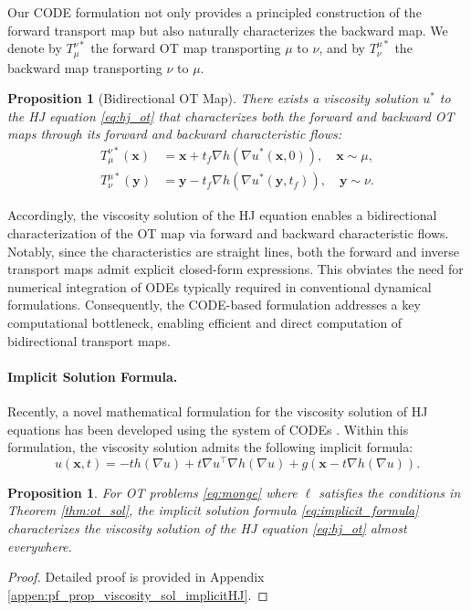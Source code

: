 \documentclass{article} %
\theoremstyle{plain}
\newtheorem{proposition}[theorem]{Proposition}
\theoremstyle{definition}
\theoremstyle{remark}
\newcommand{\bx}{\mathbf{x}}
\newcommand{\by}{\mathbf{y}}
\newcommand{\tp}{^{\top}}
\begin{document}
Our CODE formulation not only provides a principled construction of the forward transport map but also naturally characterizes the backward map. 
We denote by \( T^{\nu*}_\mu \) the forward OT map transporting \( \mu \) to \( \nu \), and by \( T^{\mu*}_\nu \) the backward map transporting \( \nu \) to \( \mu \).
\begin{proposition}[Bidirectional OT Map] 
There exists a viscosity solution $u^*$ to the HJ equation
\eqref{eq:hj_ot} that characterizes both the forward and backward OT maps through its forward and backward characteristic flows:
\vspace{-0.11cm}
\begin{align}
T^{\nu *}_{\mu}(\bx)&=\bx+t_f\nabla h\left(\nabla u^*\left(\bx,0\right)\right),\quad \bx\sim\mu, \label{eq:forward_HJOT}\\
T^{\mu *}_\nu\left(\by\right)&= \by-t_f\nabla h\left(\nabla u^*\left(\by,t_f\right)\right),\quad \by\sim\nu.
\label{eq:backward_HJOT}
\end{align}
\end{proposition}
\vspace{-0.17cm}
Accordingly, the viscosity solution of the HJ equation enables a bidirectional characterization of the OT map via forward and backward characteristic flows.
Notably, since the characteristics are straight lines, both the forward and inverse transport maps admit explicit closed-form expressions. This obviates the need for numerical integration of ODEs typically required in conventional dynamical formulations. Consequently, the CODE-based formulation addresses a key computational bottleneck, enabling efficient and direct computation of bidirectional transport maps.

\paragraph{Implicit Solution Formula.}
Recently, a novel mathematical formulation for the viscosity solution of HJ equations has been developed using the system of CODEs \citep{park2025implicit}. Within this formulation, the viscosity solution admits the following implicit formula:
\begin{equation}\label{eq:implicit_formula}
     u\left(\bx,t\right) =-th\left(\nabla u\right) + t\nabla u\tp\nabla h\left(\nabla u\right) + g\left(\bx-t\nabla h\left(\nabla u\right)\right).
\end{equation}
\begin{proposition}\label{prop:viscosity_sol_implicitHJ}
    For OT problems \eqref{eq:monge} where $\ell$ satisfies the conditions in Theorem \ref{thm:ot_sol}, the implicit solution formula \eqref{eq:implicit_formula} characterizes the viscosity solution of the HJ equation \eqref{eq:hj_ot} almost everywhere.
\end{proposition}
\vspace{-0.1cm}
\begin{proof}
    Detailed proof is provided in Appendix \ref{appen:pf_prop_viscosity_sol_implicitHJ}.
\end{proof}
\end{document}

